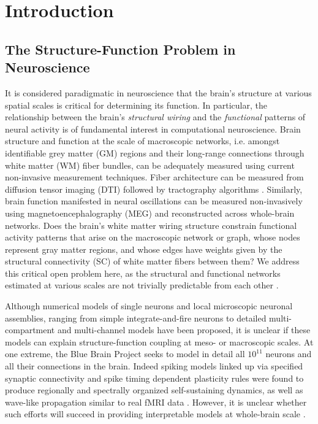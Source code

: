 \section{Introduction}

\subsection{The Structure-Function Problem in Neuroscience}
It is considered paradigmatic in neuroscience that the brain's structure
at various spatial scales is critical for determining its function. In
particular, the relationship between the brain's \emph{structural
wiring} and the \emph{functional} patterns of neural activity is of
fundamental interest in computational neuroscience. Brain structure and
function at the scale of macroscopic networks, i.e. amongst identifiable
grey matter (GM) regions and their long-range connections through white
matter (WM) fiber bundles, can be adequately measured using current
non-invasive measurement techniques. Fiber architecture can be measured
from diffusion tensor imaging (DTI) followed by tractography algorithms
\cite{hagmann_mapping_2008,iturria-medina_anatomical_2013}. Similarly, brain function manifested in neural
oscillations can be measured non-invasively using magnetoencephalography
(MEG) and reconstructed across whole-brain networks. Does the brain's
white matter wiring structure constrain functional activity patterns
that arise on the macroscopic network or graph, whose nodes represent
gray matter regions, and whose edges have weights given by the
structural connectivity (SC) of white matter fibers between them? We
address this critical open problem here, as the structural and
functional networks estimated at various scales are not trivially
predictable from each other \cite{honey_predicting_2009}.

Although numerical models of single neurons and local microscopic
neuronal assemblies, ranging from simple integrate-and-fire neurons to
detailed multi-compartment and multi-channel models
\cite{freeman_simulated_2009,liley_alpha_1999,roland_tracing_2014,markounikau_dynamic_2010,schaffer_complex-valued_2013} have been proposed, it is unclear if these models
can explain structure-function coupling at meso- or macroscopic scales.
At one extreme, the Blue Brain Project \cite{markram_blue_2006,markram_reconstruction_2015} seeks to
model in detail all $10^{11}$ neurons and all their connections in the
brain. Indeed spiking models linked up via specified synaptic
connectivity and spike timing dependent plasticity rules were found to
produce regionally and spectrally organized self-sustaining dynamics, as
well as wave-like propagation similar to real fMRI data
\cite{izhikevich_large-scale_2008}. However, it is unclear whether such efforts will
succeed in providing interpretable models at whole-brain scale
\cite{potjans_cell-type_2014}.

